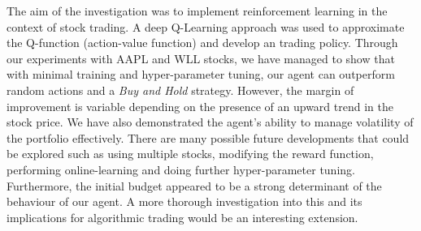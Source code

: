 \documentclass[12pt]{article}
\begin{document}
The aim of the investigation was to implement reinforcement learning in the context of stock trading. A deep Q-Learning approach was used to approximate the Q-function (action-value function) and develop an trading policy. Through our experiments with AAPL and WLL stocks, we have managed to show that with minimal training and hyper-parameter tuning, our agent can outperform random actions and a \textit{Buy and Hold} strategy. However, the margin of improvement is variable depending on the presence of an upward trend in the stock price.  We have also demonstrated the agent's ability to manage volatility of the portfolio effectively. There are many possible future developments that could be explored such as using multiple stocks, modifying the reward function, performing online-learning and doing further hyper-parameter tuning. Furthermore, the initial budget appeared to be a strong determinant of the behaviour of our agent. A more thorough investigation into this and its implications for algorithmic trading would be an interesting extension.
\end{document}
